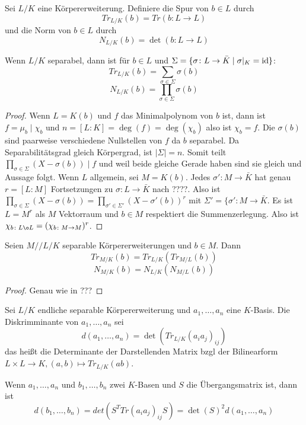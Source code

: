\begin{Def}
    Sei \(L/K\) eine Körpererweiterung.
    Definiere die Spur von \(b\in L\) durch
    \[Tr_{L/K}(b)=Tr(b\colon L\to L)\]
    und die Norm von \(b\in L\) durch 
    \[N_{L/K}(b)=\det(b\colon L\to L)\]
\end{Def}
\begin{Lemma}
    Wenn \(L/K\) separabel, dann ist für \(b\in L\) und \(\Sigma=\{\sigma\colon L\to \bar K\mid \sigma|_K=\mathrm{id}\}\):
    \[Tr_{L/K}(b)=\sum_{\sigma\in\Sigma}\sigma(b)\]
    \[N_{L/K}(b)=\prod_{\sigma\in\Sigma}\sigma(b)\]
\end{Lemma}
\begin{proof}
    Wenn \(L=K(b)\) und \(f\) das Minimalpolynom von \(b\) ist, dann ist
    \(f=\mu_b\mid \chi_b\) und \(n=[L:K]=\deg(f)=\deg(\chi_b)\) 
    also ist \(\chi_b=f\).
    Die \(\sigma(b)\) sind paarweise verschiedene Nullstellen von \(f\) da \(b\) separabel.
    Da Separabilitätsgrad gleich Körpergrad, ist \(|\Sigma|=n\).
    Somit teilt \(\prod_{\sigma\in \Sigma}(X-\sigma(b))\mid f\) und weil beide gleiche Gerade haben
    sind sie gleich und Aussage folgt.
    Wenn \(L\) allgemein, sei \(M=K(b)\).
    Jedes \(\sigma'\colon M\to \bar K\) hat genau \(r=[L:M]\) Fortsetzungen zu \(\sigma\colon L\to \bar K\) 
    nach ????.
    Also ist \(\prod_{\sigma\in \Sigma}(X-\sigma(b))=\prod_{\sigma'\in \Sigma'}(X-\sigma'(b))^r\) mit 
    \(\Sigma'=\{\sigma'\colon M\to \bar K\).
    Es ist \(L=M^r\) als \(M\) Vektorraum und \(b\in M\) respektiert die Summenzerlegung.
    Also ist \(\chi_{b\colon L\o L}=(\chi_{b\colon M\to M})^r\).

\end{proof}
\begin{Kor}
Seien \(M//L/K\) separable Körpererweiterungen und \(b\in M\).
Dann \[Tr_{M/K}(b)=Tr_{L/K}(Tr_{M/L}(b))\]
\[N_{M/K}(b)=N_{L/K}(N_{M/L}(b))\]
\end{Kor}
\begin{proof}
    Genau wie in ???
\end{proof}
\begin{Def}
    Sei \(L/K\) endliche separable Körpererweiterung und \(a_1,\dots,a_n\) eine \(K\)-Basis.
    Die Diskrimminante von \(a_1,\dots,a_n\) sei 
    \[d(a_1,\dots,a_n)=\det(Tr_{L/K}(a_ia_j)_{ij})\]
    das heißt die Determinante der Darstellenden Matrix bzgl der Bilinearform
    \(L\times L\to K, (a,b)\mapsto Tr_{L/K}(ab)\).
\end{Def}
\begin{Bem}[Basiswechsel]
    Wenn \(a_1,\dots,a_n\) und \(b_1,\dots,b_n\) zwei \(K\)-Basen und \(S\) die Übergangsmatrix ist,
    dann ist\[d(b_1,\dots,b_n)=det(S^TTr(a_ia_j)_{ij}S)=\det(S)^2d(a_1,\dots,a_n)\] 
\end{Bem}
